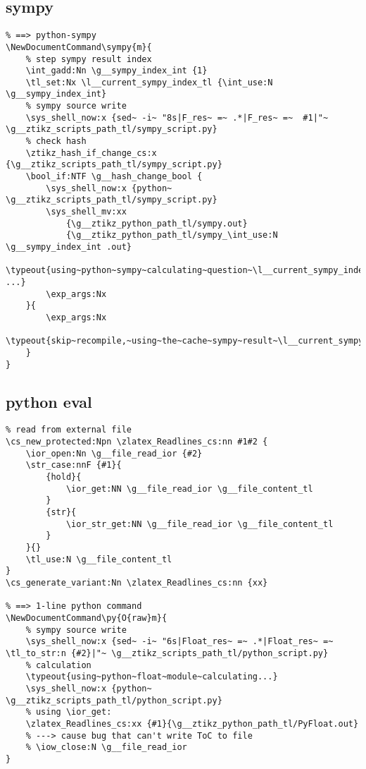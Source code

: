 \subsection{sympy}
\begin{verbatim}
% ==> python-sympy
\NewDocumentCommand\sympy{m}{
    % step sympy result index
    \int_gadd:Nn \g__sympy_index_int {1}  
    \tl_set:Nx \l__current_sympy_index_tl {\int_use:N \g__sympy_index_int}
    % sympy source write
    \sys_shell_now:x {sed~ -i~ "8s|F_res~ =~ .*|F_res~ =~  #1|"~ \g__ztikz_scripts_path_tl/sympy_script.py}
    % check hash
    \ztikz_hash_if_change_cs:x {\g__ztikz_scripts_path_tl/sympy_script.py}
    \bool_if:NTF \g__hash_change_bool {
        \sys_shell_now:x {python~ \g__ztikz_scripts_path_tl/sympy_script.py}
        \sys_shell_mv:xx
            {\g__ztikz_python_path_tl/sympy.out}
            {\g__ztikz_python_path_tl/sympy_\int_use:N \g__sympy_index_int .out}
        \typeout{using~python~sympy~calculating~question~\l__current_sympy_index_tl ...}
        \exp_args:Nx 
    }{
        \exp_args:Nx 
        \typeout{skip~recompile,~using~the~cache~sympy~result~\l__current_sympy_index_tl}
    }
}
\end{verbatim}

\subsection{python eval}
\begin{verbatim}
% read from external file 
\cs_new_protected:Npn \zlatex_Readlines_cs:nn #1#2 {
    \ior_open:Nn \g__file_read_ior {#2}
    \str_case:nnF {#1}{
        {hold}{
            \ior_get:NN \g__file_read_ior \g__file_content_tl
        }
        {str}{
            \ior_str_get:NN \g__file_read_ior \g__file_content_tl
        }
    }{}
    \tl_use:N \g__file_content_tl
}
\cs_generate_variant:Nn \zlatex_Readlines_cs:nn {xx}

% ==> 1-line python command
\NewDocumentCommand\py{O{raw}m}{
    % sympy source write
    \sys_shell_now:x {sed~ -i~ "6s|Float_res~ =~ .*|Float_res~ =~ \tl_to_str:n {#2}|"~ \g__ztikz_scripts_path_tl/python_script.py}
    % calculation
    \typeout{using~python~float~module~calculating...}
    \sys_shell_now:x {python~ \g__ztikz_scripts_path_tl/python_script.py}
    % using \ior_get: 
    \zlatex_Readlines_cs:xx {#1}{\g__ztikz_python_path_tl/PyFloat.out}
    % ---> cause bug that can't write ToC to file
    % \iow_close:N \g__file_read_ior
}
\end{verbatim}





